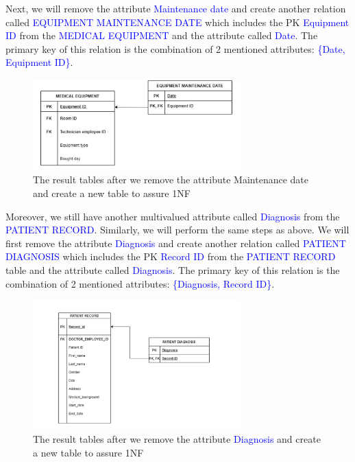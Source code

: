 \documentclass[a4paper]{article}
\numberwithin{equation}{section}
\begin{document}
Next, we will remove the attribute \textcolor{blue}{Maintenance date} and create another relation called \textcolor{blue}{EQUIPMENT MAINTENANCE DATE} which includes the PK \textcolor{blue}{Equipment ID} from the \textcolor{blue}{MEDICAL EQUIPMENT} and the attribute called \textcolor{blue}{Date}. The primary key of this relation is the combination of 2 mentioned attributes: \textcolor{blue}{\{Date, Equipment ID\}}.

\begin{figure}[H]
  \centering
  \includegraphics[width = 8cm ]{assets/1NFsolution.PNG}
  \captionsetup{justification=centering,margin=2cm}
  \caption{The result tables after we remove the attribute Maintenance date and create a new table to assure 1NF }
\end{figure}

Moreover, we still have another multivalued attribute called \textcolor{blue}{Diagnosis} from the \textcolor{blue}{PATIENT RECORD}\@.
Similarly, we will perform the same steps as above. We will first remove the attribute \textcolor{blue}{Diagnosis} and create another relation called \textcolor{blue}{PATIENT DIAGNOSIS} which includes the PK \textcolor{blue}{Record ID} from the \textcolor{blue}{PATIENT RECORD} table and the attribute called \textcolor{blue}{Diagnosis}. The primary key of this relation is the combination of 2 mentioned attributes: \textcolor{blue}{\{Diagnosis, Record ID\}}.
\begin{figure}[H]
  \centering
  \includegraphics[width = 8cm ]{assets/1NFsolution2.PNG}
  \captionsetup{justification=centering,margin=2cm}
  \caption{The result tables after we remove the attribute \textcolor{blue}{Diagnosis} and create a new table to assure 1NF}
\end{figure}
\end{document}
